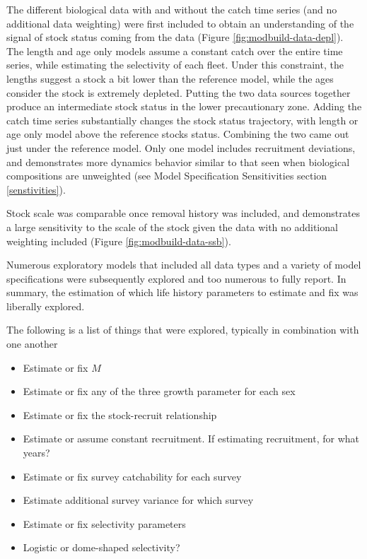 \documentclass[11pt,
  english,
  letterpaper,
]{article}
\providecommand{\tightlist}{%
  \setlength{\itemsep}{0pt}\setlength{\parskip}{0pt}}
\providecommand{\tightlist}{%
  \setlength{\itemsep}{0pt}\setlength{\parskip}{0pt}}
\begin{document}
The different biological data with and without the catch time series (and no additional data weighting) were first included to obtain an understanding of the signal of stock status coming from the data (Figure \ref{fig:modbuild-data-depl}). The length and age only models assume a constant catch over the entire time series, while estimating the selectivity of each fleet. Under this constraint, the lengths suggest a stock a bit lower than the reference model, while the ages consider the stock is extremely depleted. Putting the two data sources together produce an intermediate stock status in the lower precautionary zone. Adding the catch time series substantially changes the stock status trajectory, with length or age only model above the reference stocks status. Combining the two came out just under the reference model. Only one model includes recruitment deviations, and demonstrates more dynamics behavior similar to that seen when biological compositions are unweighted (see Model Specification Sensitivities section \ref{senstivities}).

Stock scale was comparable once removal history was included, and demonstrates a large sensitivity to the scale of the stock given the data with no additional weighting included (Figure \ref{fig:modbuild-data-ssb}).

Numerous exploratory models that included all data types and a variety of model specifications were subsequently explored and too numerous to fully report. In summary, the estimation of which life history parameters to estimate and fix was liberally explored.

The following is a list of things that were explored, typically in combination with one another

\begin{itemize}
\tightlist
\item
  Estimate or fix \(M\)
\item
  Estimate or fix any of the three growth parameter for each sex
\item
  Estimate or fix the stock-recruit relationship
\item
  Estimate or assume constant recruitment. If estimating recruitment, for what years?
\item
  Estimate or fix survey catchability for each survey
\item
  Estimate additional survey variance for which survey
\item
  Estimate or fix selectivity parameters
\item
  Logistic or dome-shaped selectivity?
\end{itemize}
\end{document}
